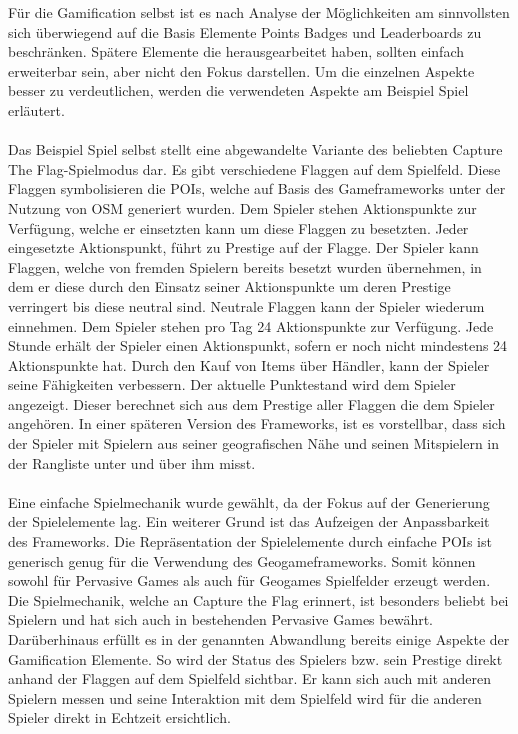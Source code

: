 Für die Gamification selbst ist es nach Analyse der Möglichkeiten am sinnvollsten sich überwiegend auf die Basis Elemente Points Badges und Leaderboards zu beschränken. Spätere Elemente die \textcite{Zichermann.2011} herausgearbeitet haben, sollten einfach erweiterbar sein, aber nicht den Fokus darstellen. Um die einzelnen Aspekte besser zu verdeutlichen, werden die verwendeten Aspekte am Beispiel Spiel erläutert.
\\\\
Das Beispiel Spiel selbst stellt eine abgewandelte Variante des beliebten Capture The Flag-Spielmodus dar.\cite{Atkin.1999}
Es gibt verschiedene Flaggen auf dem Spielfeld. Diese Flaggen symbolisieren die POIs, welche auf Basis des Gameframeworks unter der Nutzung von OSM generiert wurden. Dem Spieler stehen Aktionspunkte zur Verfügung, welche er einsetzten kann um diese Flaggen zu besetzten. Jeder eingesetzte Aktionspunkt, führt zu \glqq Prestige\grqq{} auf der Flagge. Der Spieler kann Flaggen, welche von fremden Spielern bereits besetzt wurden übernehmen, in dem er diese durch den Einsatz seiner Aktionspunkte um deren Prestige verringert bis diese neutral sind. Neutrale Flaggen kann der Spieler wiederum einnehmen. Dem Spieler stehen pro Tag 24 Aktionspunkte zur Verfügung. Jede Stunde erhält der Spieler einen Aktionspunkt, sofern er noch nicht mindestens 24 Aktionspunkte hat. Durch den Kauf von Items über Händler, kann der Spieler seine Fähigkeiten verbessern. Der aktuelle Punktestand wird dem Spieler angezeigt.
Dieser berechnet sich aus dem Prestige aller Flaggen die dem Spieler angehören. 
In einer späteren Version des Frameworks, ist es vorstellbar, dass sich der Spieler mit Spielern aus seiner geografischen Nähe und seinen Mitspielern in der Rangliste unter und über ihm misst.
\\\\
Eine einfache Spielmechanik wurde gewählt, da der Fokus auf der Generierung der Spielelemente lag. Ein weiterer Grund ist das Aufzeigen der Anpassbarkeit des Frameworks. Die Repräsentation der Spielelemente durch einfache POIs ist generisch genug für die Verwendung des Geogameframeworks. Somit können sowohl für Pervasive Games als auch für Geogames Spielfelder erzeugt werden. Die Spielmechanik, welche an Capture the Flag erinnert, ist besonders beliebt bei Spielern und hat sich auch in bestehenden Pervasive Games bewährt.\cite{Bell.2006,Ingress.2014} Darüberhinaus erfüllt es in der genannten Abwandlung bereits einige Aspekte der Gamification Elemente. So wird der Status des Spielers bzw. sein \glqq Prestige\grqq{} direkt anhand der Flaggen auf dem Spielfeld sichtbar. Er kann sich auch mit anderen Spielern messen und seine Interaktion mit dem Spielfeld wird für die anderen Spieler direkt in Echtzeit ersichtlich.
